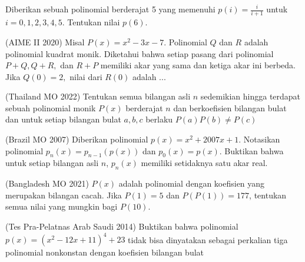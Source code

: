 \documentclass[11pt]{scrartcl}
\begin{document}
\begin{problem}
    Diberikan sebuah polinomial berderajat 5 yang memenuhi $p(i) = \frac{i}{i + 1}$ untuk $i = 0,1,2,3,4,5$. Tentukan nilai $p(6)$.
\end{problem}

\begin{problem}
(AIME II 2020) Misal $P(x) = x^2 - 3x - 7$. Polinomial $Q$ dan $R$ adalah polinomial kuadrat monik. Diketahui bahwa setiap pasang dari polinomial $P+Q, Q+R, $  dan $R+P$ memiliki akar yang sama dan ketiga akar ini berbeda. Jika $Q(0) = 2,$ nilai dari $R(0)$ adalah ... 
\end{problem}

\begin{problem}
    (Thailand MO 2022) Tentukan semua bilangan asli $n$ sedemikian hingga terdapat sebuah polinomial monik $P(x)$ berderajat $n$ dan berkoefisien bilangan bulat dan untuk setiap bilangan bulat $a, b, c$ berlaku $P(a)P(b) \neq P(c)$
\end{problem}

\begin{problem}
    (Brazil MO 2007) Diberikan polinomial $p(x) = x^2 + 2007x + 1$. Notasikan polinomial $p_n(x) = p_{n - 1}(p(x))$ dan $p_0(x) = p(x)$. Buktikan bahwa untuk setiap bilangan asli $n$, $p_n(x)$ memiliki setidaknya satu akar real. 
\end{problem}

\begin{problem}
    (Bangladesh MO 2021) $P(x)$ adalah polinomial dengan koefisien yang merupakan bilangan cacah. Jika $P(1) = 5$ dan $P(P(1)) = 177$, tentukan semua nilai yang mungkin bagi $P(10)$.
\end{problem}

\begin{problem}
    (Tes Pra-Pelatnas Arab Saudi 2014) Buktikan bahwa polinomial $p(x) = (x^2 - 12x + 11)^4 + 23$ tidak bisa dinyatakan sebagai perkalian tiga polinomial nonkonstan dengan koefisien bilangan bulat
\end{problem}


\end{document}
